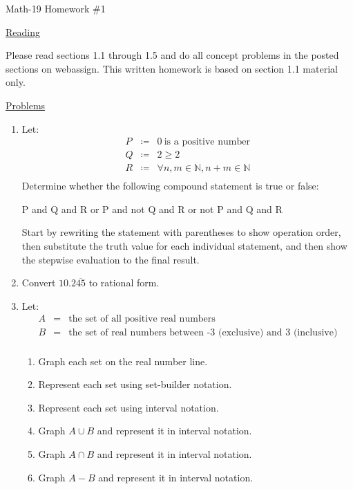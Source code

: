 \documentclass[letterpaper,12pt,fleqn]{article}
\begin{document}
\begin{center}
\Large Math-19 Homework \#1
\end{center}

\vspace{0.5in}

\underline{Reading}

Please read sections 1.1 through 1.5 and do all concept problems in the posted
sections on web\-assign. This written homework is based on section 1.1 material
only.

\underline{Problems}

\begin{enumerate}
\item Let:
\begin{eqnarray*}
P &\coloneqq& 0\ \mbox{is a positive number} \\
Q &\coloneqq& 2\ge2 \\
R &\coloneqq& \forall n,m\in\mathbb{N}, n+m\in\mathbb{N} \\
\end{eqnarray*}
Determine whether the following compound statement is true or false:

\hspace{0.5in}P and Q and R or P and not Q and R or not P and Q and R

Start by rewriting the statement with parentheses to show operation order,
then substitute the truth value for each individual statement, and then
show the stepwise evaluation to the final result.

\item Convert $10.2\overline{45}$ to rational form.

\item Let:
\begin{eqnarray*}
A &=& \mbox{the set of all positive real numbers} \\
B &=& \mbox{the set of real numbers between -3 (exclusive) and 3 (inclusive)} \\
\end{eqnarray*}
\begin{enumerate}
\item Graph each set on the real number line.
\item Represent each set using set-builder notation.
\item Represent each set using interval notation.
\item Graph $A\cup B$ and represent it in interval notation.
\item Graph $A\cap B$ and represent it in interval notation.
\item Graph $A-B$ and represent it in interval notation.
\end{enumerate}


\end{enumerate}
\end{document}
